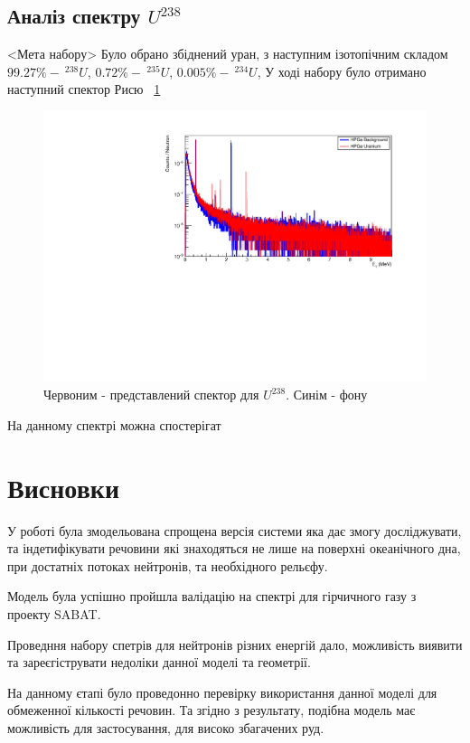 \documentclass[a4paper, 14pt]{article}
\numberwithin{equation}{section}
\numberwithin{table}{section}
\begin{document}
\subsection{Аналіз спектру $U^{238}$}
	<Мета набору> Було обрано збіднений уран, з наступним ізотопічним складом $99.27\% -\  ^{238}U$, $ 0.72\% - \  ^{235}U$, $ 0.005\% - \ ^{234}U$, У ході набору було отримано наступний спектор Рисю ~\ref{ris:poorU}
	\begin{figure}[hbt!]
		\centering \includegraphics[width=1\textwidth]{res/poorUranium.pdf}
		\caption{Червоним - представлений спектор для $U^{238}$. Синім - фону} 
		\label{ris:poorU}	
	\end{figure} 	 
	На данному спектрі можна спостерігат
	
\newpage 
\section{Висновки}
\setcounter{figure}{0}
У роботі була змодельована спрощена версія системи яка дає змогу досліджувати, та індетифікувати речовини які знаходяться не лише на поверхні океанічного дна, при достатніх потоках нейтронів, та необхідного рельєфу.

Модель була успішно пройшла валідацію на спектрі для гірчичного газу з проекту SABAT. 

Проведння набору спетрів для нейтронів різних енергій дало, можливість виявити та зареєгіструвати недоліки данної моделі та геометрії. 

На данному єтапі було проведонно перевірку використання данної моделі для обмеженної кількості речовин. Та згідно з результату, подібна модель має можливість для застосування, для високо збагачених руд.
\end{document}
